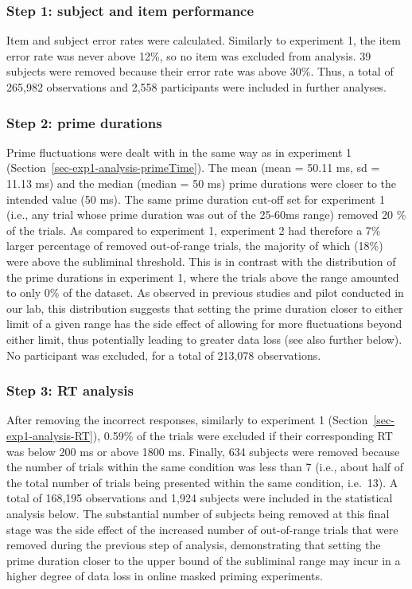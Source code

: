 \documentclass[
]{interact}
\begin{document}
\subsubsection{Step 1: subject and item
performance}\label{sec-exp2-analysis-performance}

Item and subject error rates were calculated. Similarly to experiment 1,
the item error rate was never above 12\%, so no item was excluded from
analysis. 39 subjects were removed because their error rate was above
30\%. Thus, a total of 265,982 observations and 2,558 participants were
included in further analyses.

\subsubsection{Step 2: prime
durations}\label{sec-exp2-analysis-primeTime}

Prime fluctuations were dealt with in the same way as in experiment 1
(Section~\ref{sec-exp1-analysis-primeTime}). The mean (mean = 50.11 ms,
sd = 11.13 ms) and the median (median = 50 ms) prime durations were
closer to the intended value (50 ms). The same prime duration cut-off
set for experiment 1 (i.e., any trial whose prime duration was out of
the 25-60ms range) removed 20 \% of the trials. As compared to
experiment 1, experiment 2 had therefore a 7\% larger percentage of
removed out-of-range trials, the majority of which (18\%) were above the
subliminal threshold. This is in contrast with the distribution of the
prime durations in experiment 1, where the trials above the range
amounted to only 0\% of the dataset. As observed in previous studies and
pilot conducted in our lab, this distribution suggests that setting the
prime duration closer to either limit of a given range has the side
effect of allowing for more fluctuations beyond either limit, thus
potentially leading to greater data loss (see also further below). No
participant was excluded, for a total of 213,078 observations.

\subsubsection{Step 3: RT analysis}\label{sec-exp2-analysis-RT}

After removing the incorrect responses, similarly to experiment 1
(Section~\ref{sec-exp1-analysis-RT}), 0.59\% of the trials were excluded
if their corresponding RT was below 200 ms or above 1800 ms. Finally,
634 subjects were removed because the number of trials within the same
condition was less than 7 (i.e., about half of the total number of
trials being presented within the same condition, i.e.~13). A total of
168,195 observations and 1,924 subjects were included in the statistical
analysis below. The substantial number of subjects being removed at this
final stage was the side effect of the increased number of out-of-range
trials that were removed during the previous step of analysis,
demonstrating that setting the prime duration closer to the upper bound
of the subliminal range may incur in a higher degree of data loss in
online masked priming experiments.
\end{document}
